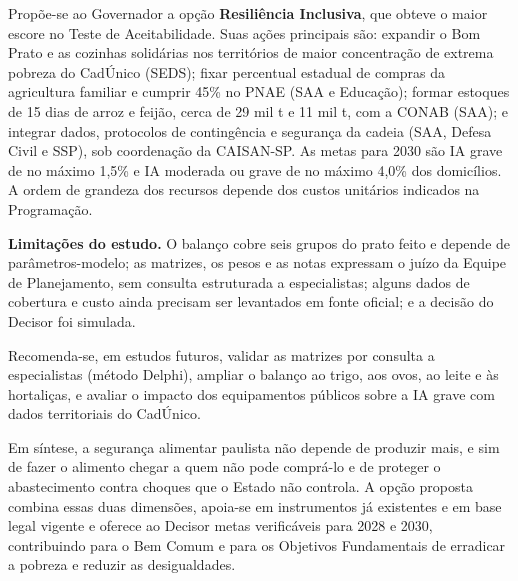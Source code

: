 \documentclass[
	12pt,				%
	openright,			%
	oneside,			%
	a4paper,			%
	chapter=TITLE,		%
	section=TITLE,		%
	english,			%
	french,				%
	spanish,			%
	brazil,				%
 ]{abntex2}
\begin{document}
Propõe-se ao Governador a opção \textbf{Resiliência Inclusiva}, que obteve o
maior escore no Teste de Aceitabilidade. Suas ações principais são: expandir o
Bom Prato e as cozinhas solidárias nos territórios de maior concentração de
extrema pobreza do CadÚnico (SEDS); fixar percentual estadual de compras da
agricultura familiar e cumprir 45\% no PNAE (SAA e Educação); formar estoques de
15 dias de arroz e feijão, cerca de 29 mil t e 11 mil t, com a CONAB (SAA); e
integrar dados, protocolos de contingência e segurança da cadeia (SAA, Defesa
Civil e SSP), sob coordenação da CAISAN-SP. As metas para 2030 são IA
grave de no máximo 1,5\% e IA moderada ou grave de no máximo 4,0\% dos
domicílios. A ordem de grandeza dos recursos depende dos custos unitários
indicados na Programação.

\textbf{Limitações do estudo.} O balanço cobre seis grupos do prato feito e
depende de parâmetros-modelo; as matrizes, os pesos e as notas expressam o juízo
da Equipe de Planejamento, sem consulta estruturada a especialistas; alguns
dados de cobertura e custo ainda precisam ser levantados em fonte oficial; e a
decisão do Decisor foi simulada.

Recomenda-se, em estudos futuros, validar as matrizes por consulta a
especialistas (método Delphi), ampliar o balanço ao trigo, aos ovos, ao leite e
às hortaliças, e avaliar o impacto dos equipamentos públicos sobre a IA grave
com dados territoriais do CadÚnico.

Em síntese, a segurança alimentar paulista não depende de produzir mais, e sim
de fazer o alimento chegar a quem não pode comprá-lo e de proteger o
abastecimento contra choques que o Estado não controla. A opção proposta
combina essas duas dimensões, apoia-se em instrumentos já existentes e em base
legal vigente e oferece ao Decisor metas verificáveis para 2028 e 2030,
contribuindo para o Bem Comum e para os Objetivos Fundamentais de erradicar a
pobreza e reduzir as desigualdades.

\postextual

\renewcommand{\bibname}{Bibliografia}
\renewcommand{\bibsection}{\chapter{\bibname}}

\sloppy
\nocite{abnt-options}

\end{document}
